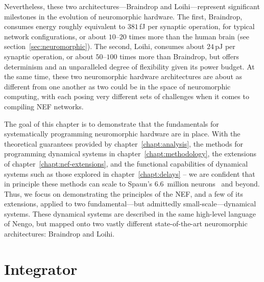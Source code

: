 Nevertheless, these two architectures---Braindrop and Loihi---represent significant milestones in the evolution of neuromorphic hardware.
The first, Braindrop, consumes energy roughly equivalent to $381$\,fJ per synaptic operation, for typical network configurations, or about $10$--$20$ times more than the human brain (see section~\ref{sec:neuromorphic}).
The second, Loihi, consumes about $24$\,pJ per synaptic operation, or about $50$--$100$ times more than Braindrop, but offers determinism and an unparalleled degree of flexibility given its power budget.
At the same time, these two neuromorphic hardware architectures are about as different from one another as two could be in the space of neuromorphic computing, with each posing very different sets of challenges when it comes to compiling NEF networks.

The goal of this chapter is to demonstrate that the fundamentals for systematically programming neuromorphic hardware are in place.
With the theoretical guarantees provided by chapter~\ref{chapt:analysis}, the methods for programming dynamical systems in chapter~\ref{chapt:methodology}, the extensions of chapter~\ref{chapt:nef-extensions}, and the functional capabilities of dynamical systems such as those explored in chapter~\ref{chapt:delays} -- we are confident that in principle these methods can scale to Spaun's 6.6~million neurons~\citep{choo2018} and beyond.
Thus, we focus on demonstrating the principles of the NEF, and a few of its extensions, applied to two fundamental---but admittedly small-scale---dynamical systems.
These dynamical systems are described in the same high-level language of Nengo, but mapped onto two vastly different state-of-the-art neuromorphic architectures: Braindrop and Loihi.

\section{Integrator}
\label{sec:integrator}

